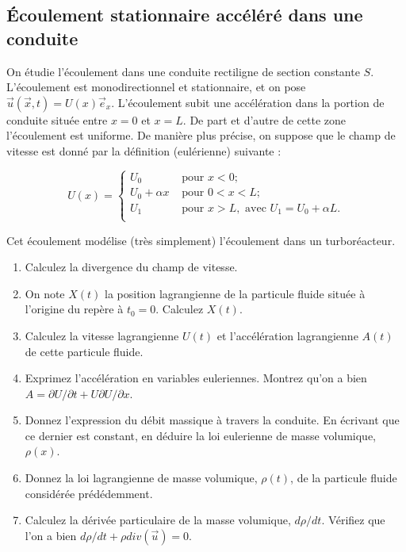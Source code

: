 \subsection{\'Ecoulement stationnaire accéléré dans une conduite}


On étudie l'écoulement dans une conduite rectiligne de 
section constante $S$. L'écoulement est monodirectionnel et stationnaire,
et on pose  $\vec u (\vec x, t) =  U(x)\vec e_x$.
L'écoulement subit une accélération dans la portion de conduite située
entre $x=0$ et $x=L$. 
De part et d'autre de cette zone l'écoulement est uniforme.
De manière plus précise, on suppose que le champ de vitesse est 
donné par la définition (eulérienne) suivante :

$$
U(x) = \left\{ 
\begin{array}{ll} 
U_0 &  \mbox{ pour } x<0; \\
U_0+ \alpha x & \mbox{ pour }  0<x<L; \\
U_1 &\mbox{ pour } x>L,  \mbox{ avec }  U_1 = U_0 + \alpha L. \\
\end{array}
\right.
$$

Cet écoulement modélise (très simplement) l'écoulement dans un
turboréacteur.

\begin{enumerate}

\item Calculez la divergence du champ de vitesse.

\item On note $X(t)$ la position lagrangienne de la particule
fluide située à l'origine du repère à $t_0 = 0$. Calculez $X(t)$.

\item Calculez la vitesse lagrangienne $U(t)$ et l'accélération 
lagrangienne $A(t)$ de cette particule fluide.

\item Exprimez l'accélération en variables euleriennes.  
Montrez qu'on a bien $A = \partial U / \partial t + U \partial U / \partial x$.

\item Donnez l'expression du débit massique à travers la conduite.
En écrivant que ce dernier est constant, en déduire la loi eulerienne
de masse volumique, $\rho(x)$.

\item Donnez la loi lagrangienne de masse volumique, $ \rho(t)$, de
la particule fluide considérée prédédemment.

\item Calculez la dérivée particulaire de la masse volumique, $d\rho/dt$.
Vérifiez que l'on a bien $d\rho / dt + \rho div (\vec u) = 0$.

  
\end{enumerate}



